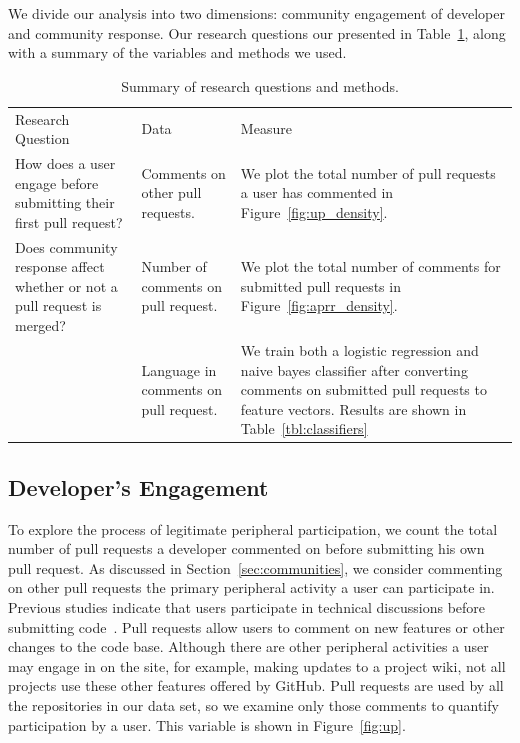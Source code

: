 \documentclass{sigchi}
\begin{document}
We divide our analysis into two dimensions: community engagement of developer and
community response. Our research questions our presented in
Table~\ref{tbl:research_questions}, along with a summary of the variables and
methods we used.

\begin{table}[ht] \centering
\caption{Summary of research questions and methods.}
\label{tbl:research_questions}
\begin{tabular}{ p{2.1in} p{2.1in} p{2.3in} }
\hline\hline
Research Question
& Data                                  & Measure
\\
How does a user engage before submitting their first pull request?
& Comments on other pull requests.      & We plot the total number
of pull requests a user has commented in
Figure~\ref{fig:up_density}.
\\
Does community response affect whether or not a pull request is
merged? & Number of comments on pull request.   & We plot the
total number of comments for submitted pull requests in
Figure~\ref{fig:aprr_density}.
\\
~
& Language in comments on pull request. & We train both a
logistic regression and naive bayes classifier after
converting comments on submitted pull requests to feature
vectors. Results are shown in
Table~\ref{tbl:classifiers} \\
\hline
\end{tabular}
\end{table}

\subsection{Developer's Engagement}
To explore the process of legitimate peripheral participation, we count the
total number of pull requests a developer commented on before submitting his own
pull request. As discussed in Section~\ref{sec:communities}, we consider
commenting on other pull requests the primary peripheral activity a user can
participate in. Previous studies indicate that users participate in technical
discussions before submitting code~\cite{von_krogh_community_2003}. Pull
requests allow users to comment on new features or other changes to the code
base. Although there are other peripheral activities a user may engage in on the
site, for example, making updates to a project wiki, not all projects use these
other features offered by GitHub. Pull requests are used by all the repositories
in our data set, so we examine only those comments to quantify participation by
a user. This variable is shown in Figure~\ref{fig:up}.
\end{document}
